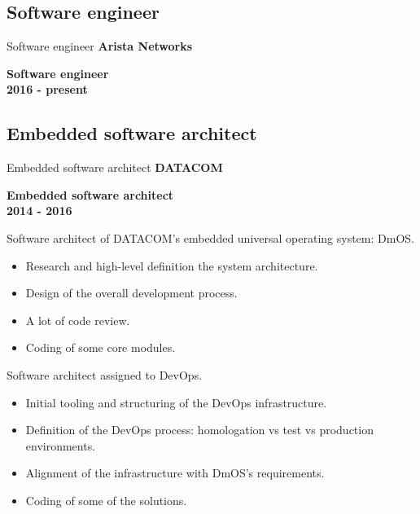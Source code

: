 \documentclass[ignorenonframetext]{beamer}
\providecommand{\tightlist}{\setlength{\itemsep}{0pt}\setlength{\parskip}{0pt}}
\newcommand{\myempha}[1]{{\color{dark27c1}\bf #1}}
\newcommand{\myemphb}[1]{{\color{dark27c2}\bf #1}}
\newcommand{\myemphc}[1]{{\color{dark27c3}\bf #1}}
\begin{document}
\subsection{Software engineer}
\begin{frame}[allowframebreaks]{Software engineer}
    \myempha{Arista Networks}

    \myemphb{Software engineer} \\
    \hfill \myemphc{2016 - present}

    
\end{frame}



\subsection{Embedded software architect}
\begin{frame}[allowframebreaks]{Embedded software architect}
    \myempha{DATACOM}

    \myemphb{Embedded software architect} \\
    \hfill \myemphc{2014 - 2016}

    Software architect of DATACOM's embedded universal operating system:
DmOS.
\begin{itemize}
\tightlist
\item
  Research and high-level definition the system architecture.
\item
  Design of the overall development process.
\item
  A lot of code review.
\item
  Coding of some core modules.
\end{itemize}

Software architect assigned to DevOps.
\begin{itemize}
\tightlist
\item
  Initial tooling and structuring of the DevOps infrastructure.
\item
  Definition of the DevOps process: homologation vs test vs production
  environments.
\item
  Alignment of the infrastructure with DmOS's requirements.
\item
  Coding of some of the solutions.
\end{itemize}

\end{frame}
\end{document}
